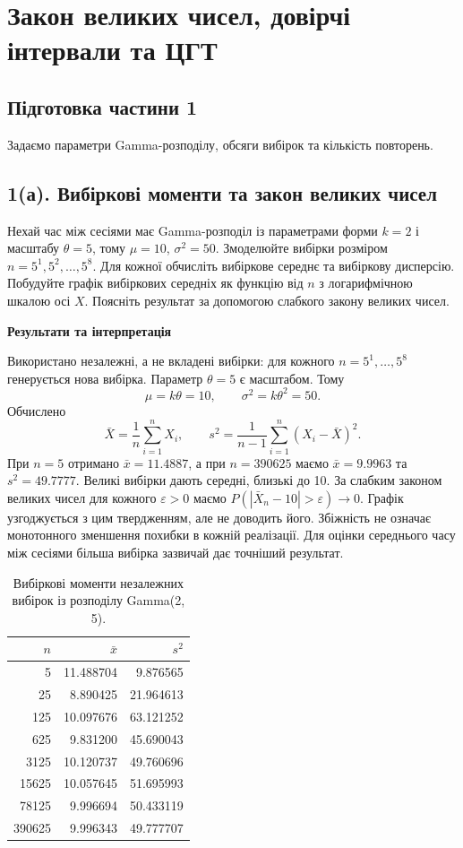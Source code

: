 \documentclass[11pt,a4paper]{article}
\newcommand{\pythoncode}[1]{%
  \Needspace{6\baselineskip}
  \begin{tcolorbox}[enhanced,breakable,colback=black!2!white,colframe=black!15!white,
    colbacktitle=black!6!white,coltitle=accent,fonttitle=\bfseries\small,
    title=Код Python,title after break={Код Python (продовження)},boxrule=0.4pt,arc=1mm,left=2mm,right=2mm,top=2mm,bottom=2mm,
    before skip=6pt,after skip=8pt]
  
  \end{tcolorbox}}
\newcommand{\answerheading}{\Needspace{4\baselineskip}\par\medskip
  {\color{answergreen}\bfseries Результати та інтерпретація}\par\smallskip}
\begin{document}
\section{Закон великих чисел, довірчі інтервали та ЦГТ}
\subsection*{Підготовка частини 1}
Задаємо параметри Gamma-розподілу, обсяги вибірок та кількість повторень.
\pythoncode{part1-cell2}
\subsection*{1(а). Вибіркові моменти та закон великих чисел}
\begin{taskstatement}
Нехай час між сесіями має Gamma-розподіл із параметрами форми $k=2$ і масштабу $\theta=5$, тому $\mu=10$, $\sigma^2=50$.
Змоделюйте вибірки розміром $n=5^1,5^2,\ldots,5^8$. Для кожної обчисліть вибіркове середнє та вибіркову дисперсію.
Побудуйте графік вибіркових середніх як функцію від $n$ з логарифмічною шкалою осі $X$.
Поясніть результат за допомогою слабкого закону великих чисел.
\end{taskstatement}


\pythoncode{part1-cell4}
\answerheading
Використано незалежні, а не вкладені вибірки: для кожного \(n=5^1,\ldots,5^8\) генерується нова вибірка. Параметр \(\theta=5\) є масштабом. Тому \[\mu=k\theta=10,\qquad \sigma^2=k\theta^2=50.\] Обчислено \[\bar X=\frac1n\sum_{i=1}^nX_i,\qquad s^2=\frac1{n-1}\sum_{i=1}^n(X_i-\bar X)^2.\] При \(n=5\) отримано \(\bar x=11.4887\), а при \(n=390625\) маємо \(\bar x=9.9963\) та \(s^2=49.7777\). Великі вибірки дають середні, близькі до 10. За слабким законом великих чисел для кожного \(\varepsilon>0\) маємо \(P(|\bar X_n-10|>\varepsilon)\to0\). Графік узгоджується з цим твердженням, але не доводить його. Збіжність не означає монотонного зменшення похибки в кожній реалізації. Для оцінки середнього часу між сесіями більша вибірка зазвичай дає точніший результат.

\begin{table}[H]
\centering
\small
\caption{Вибіркові моменти незалежних вибірок із розподілу Gamma(2, 5).}
\begin{tabular}{rrr}
\toprule
$n$ & $\bar x$ & $s^2$ \\
\midrule
5 & 11.488704 & 9.876565 \\
25 & 8.890425 & 21.964613 \\
125 & 10.097676 & 63.121252 \\
625 & 9.831200 & 45.690043 \\
3125 & 10.120737 & 49.760696 \\
15625 & 10.057645 & 51.695993 \\
78125 & 9.996694 & 50.433119 \\
390625 & 9.996343 & 49.777707 \\
\bottomrule
\end{tabular}
\end{table}
\end{document}
